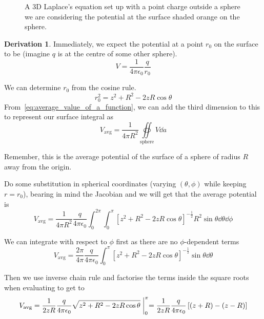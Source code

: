 \documentclass[12pt,chapterprefix=false,dvipsnames]{scrbook}
\theoremstyle{dotless}
\theoremstyle{definition}
\newtheorem{protoderivation}{Derivation}[section]
\newenvironment{derivation}
{\colorlet{shadecolor}{purple!15}\begin{shaded}\begin{protoderivation}}
			{\end{protoderivation}\end{shaded}}
\begin{document}
\begin{figure}[htpb]
	\centering
	
	\caption{A 3D Laplace's equation set up with a point charge outside a
		sphere we are considering the potential at the surface shaded
		orange on the sphere.}%
	\label{fig:3d_laplacian}%
\end{figure}

\begin{derivation}%
	\label{dv:charge_from_average}%
	Immediately, we expect the potential at a point
	$r_0$ on the surface to be (imagine
	$q$ is at the centre of some other sphere).
	\begin{equation}
		V = \frac{1}{4\pi\epsilon_{0}}\frac{q}{r_0}
	\end{equation}

	We can determine $r_0$ from the cosine rule.
	\begin{equation}
		r_0^2 = z^2 + R^2 - 2zR\cos{\theta}
	\end{equation}
	From~\ref{eq:average_value_of_a_function}, we can add the third dimension to
	this to represent our surface integral as
	\begin{equation}
		V_{\mathrm{avg}} =
		\frac{1}{4\pi R^2}\oiint\limits_{\mathrm{sphere}} V
		\dd{a}
	\end{equation}

	Remember, this is the average potential of the surface of a
	sphere of radius $R$ away from the origin.

	Do some substitution in spherical coordinates (varying
	$(\theta,
		\phi)$ while keeping $r = r_0$),
	bearing in mind the Jacobian and we will get that the average
	potential is
	\begin{equation}
		V_{\mathrm{avg}} =
		\frac{1}{4\pi R^2}\frac{q}{4\pi\epsilon_{0}}
		\int_0^{2\pi}\int_0^{\pi} {\left[ z^2 + R^2 - 2zR\cos{\theta} \right]}^{-\frac{1}{2}} R^2
		\sin{\theta}\dd{\theta}
		\dd{\phi}
	\end{equation}

	We can integrate with respect to $\phi$ first
	as there are no $\phi$-dependent terms
	\begin{equation}
		V_{\mathrm{avg}} =
		\frac{2\pi}{4\pi}\frac{q}{4\pi\epsilon_{0}}
		\int_0^{\pi} {\left[ z^2 + R^2 - 2zR\cos{\theta} \right]}^{-\frac{1}{2}}
		\sin{\theta}\dd{\theta}
	\end{equation}

	Then we use inverse chain rule and factorise the terms inside
	the square roots when evaluating to get to
	\begin{equation}
		V_{\mathrm{avg}} =
		\frac{1}{2zR}\frac{q}{4\pi\epsilon_{0}}
		\sqrt{ z^2 + R^2 - 2zR\cos{\theta} }\biggm \rvert^{\pi}_{0} =
		\frac{1}{2zR}\frac{q}{4\pi\epsilon_{0}}
		\left[ (z + R) - (z - R) \right]
	\end{equation}


\end{derivation}
\end{document}
